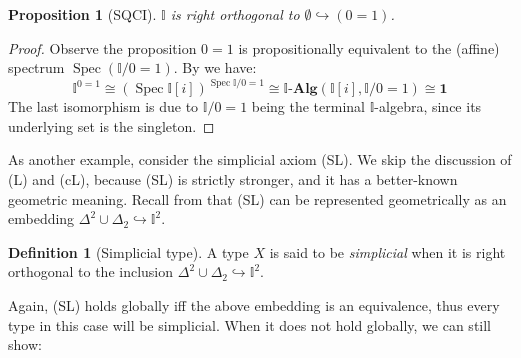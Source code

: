 \documentclass[a4paper,12pt]{amsart}
\newtheorem{proposition}[theorem]{Proposition}
\theoremstyle{definition}
\newtheorem{definition}[theorem]{Definition}
\newcommand{\mb}[1]{\mathbf{#1}}
\newcommand{\mbb}[1]{\mathbb{#1}}
\newcommand{\I}{\mbb I}
\newcommand{\alg}{\text{-}\mb{Alg}}
\newcommand{\hook}{\hookrightarrow}
\newcommand{\emp}{\emptyset}
\newcommand{\spec}{\operatorname{Spec}}
\begin{document}
\begin{proposition}[SQCI]\label{specisnontrivial}
  $\I$ is right orthogonal to $\emp \hook (0 = 1)$.
\end{proposition}
\begin{proof}
  Observe the proposition $0 = 1$ is propositionally equivalent to the (affine) spectrum $\spec(\I/0=1)$. By  we have:
  \[ 
    \I^{0=1} \cong 
    (\spec \I[i])^{\spec{\I/0=1}}
    \cong 
    \I\alg(\I[i], \I/0=1) 
    \cong 
    \mathbf{1}
  \]
  The last isomorphism is due to $\I/0=1$ being the terminal $\I$-algebra, since its underlying set is the singleton.
\end{proof}

As another example, consider the simplicial axiom (SL). We skip the discussion of (L) and (cL), because (SL) is strictly stronger, and it has a better-known geometric meaning. Recall from  that (SL) can be represented geometrically as an embedding $\Delta^2\cup\Delta_2 \hook \I^2$.

\begin{definition}[Simplicial type]
  A type $X$ is said to be \emph{simplicial} when it is right orthogonal to the inclusion $\Delta^2 \cup \Delta_2 \hook \I^2$.
\end{definition}

Again, (SL) holds globally iff the above embedding is an equivalence, thus every type in this case will be simplicial. When it does not hold globally, we can still show:
\end{document}
